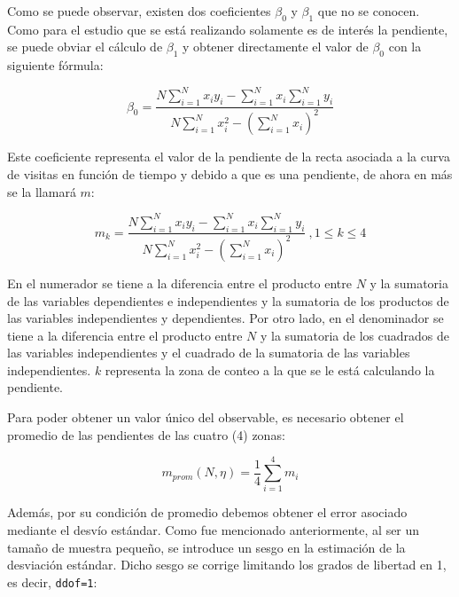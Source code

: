 \documentclass[11pt, a4paper]{article}
\begin{document}
            Como se puede observar, existen dos coeficientes $\beta_0$ y $\beta_1$ que no se conocen.
            Como para el estudio que se está realizando solamente es de interés la pendiente, se puede obviar el cálculo
            de $\beta_1$ y obtener directamente el valor de $\beta_0$ con la siguiente fórmula:

            \begin{equation}
                \beta_0 = \frac{N \sum_{i=1}^N x_i y_i - \sum_{i=1}^N x_i \sum_{i=1}^N y_i }{N \sum_{i=1}^N x_i^2 - \left(\sum_{i=1}^N x_i \right)^2}
            \end{equation}

            Este coeficiente representa el valor de la pendiente de la recta asociada a la curva de visitas en función de tiempo y
            debido a que es una pendiente, de ahora en más se la llamará $m$:

            \begin{equation}
                m_k = \frac{N \sum_{i=1}^N x_i y_i - \sum_{i=1}^N x_i \sum_{i=1}^N y_i }{N \sum_{i=1}^N x_i^2 - \left(\sum_{i=1}^N x_i \right)^2}
                \ , 1 \leq k \leq 4
            \end{equation}

            En el numerador se tiene a la diferencia entre el producto entre $N$ y la sumatoria de las variables dependientes e independientes
            y la sumatoria de los productos de las variables independientes y dependientes.
            Por otro lado, en el denominador se tiene a la diferencia entre el producto entre $N$ y la sumatoria de los
            cuadrados de las variables independientes y el cuadrado de la sumatoria de las variables independientes.
            $k$ representa la zona de conteo a la que se le está calculando la pendiente.

            Para poder obtener un valor único del observable, es necesario obtener el promedio de las pendientes de las cuatro (4) zonas:

            \begin{equation}
                m_{prom}(N,\eta) = \frac{1}{4} \sum_{i=1}^{4} m_i
            \end{equation}

            Además, por su condición de promedio debemos obtener el error asociado mediante el desvío estándar.
            Como fue mencionado anteriormente, al ser un tamaño de muestra pequeño, se introduce un sesgo en la estimación de la desviación estándar. Dicho sesgo se corrige limitando los grados de libertad en 1, es decir, \texttt{ddof=1}:
\end{document}

